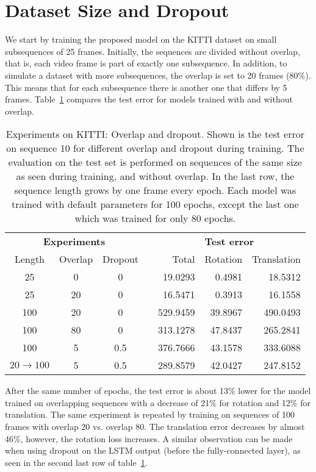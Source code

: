 	\section{Dataset Size and Dropout}
		We start by training the proposed model on the KITTI dataset on small subsequences of 25 frames. 
		Initially, the sequences are divided without overlap, that is, each video frame is part of exactly one subsequence.
		In addition, to simulate a dataset with more subsequences, the overlap is set to 20 frames (80\%). 
		This means that for each subsequence there is another one that differs by 5 frames.
		Table~\ref{tbl:kitti-overlap-and-dropout} compares the test error for models trained with and without overlap.
		\begin{table}[tb]
			\small
			\begin{center}
				\begin{tabular}{ccccrrr}
					\toprule
					\multicolumn{3}{c}{\textbf{Experiments}}	&	& \multicolumn{3}{c}{\textbf{Test error}} 		\\
					\cmidrule(lr){1-3} 					\cmidrule(lr){5-7}
					Length 			& Overlap 	& Dropout	&	& Total 	& Rotation	& Translation	\\ 
					\midrule
					25				& 0			& 0			& 	& 19.0293	& 0.4981	& 18.5312		\\ 
					25				& 20		& 0			&	& 16.5471	& 0.3913	& 16.1558		\\ 
					100				& 20		& 0			&	& 529.9459	& 39.8967	& 490.0493		\\ 
					100				& 80		& 0			& 	& 313.1278	& 47.8437	& 265.2841		\\ 
					100 			& 5			& 0.5		&	& 376.7666	& 43.1578	& 333.6088		\\ 
					$20\rightarrow100$ 	& 5		& 0.5		&	& 289.8579 	& 42.0427 	& 247.8152 		\\
					\bottomrule
				\end{tabular}
			\end{center}
			\caption[Experiments on KITTI: Overlap and dropout]
					{Experiments on KITTI: Overlap and dropout. 
					 Shown is the test error on sequence 10 for different overlap and dropout during training.
					 The evaluation on the test set is performed on sequences of the same size as seen during training, and without overlap.
					 In the last row, the sequence length grows by one frame every epoch.
					 Each model was trained with default parameters for 100 epochs, except the last one which was trained for only 80 epochs.
					 \label{tbl:kitti-overlap-and-dropout}}
		\end{table}
		After the same number of epochs, the test error is about 13\% lower for the model trained on overlapping sequences with a decrease of 21\% for rotation and 12\% for translation.
		The same experiment is repeated by training on sequences of 100 frames with overlap 20 vs. overlap 80. 
		The translation error decreases by almost 46\%, however, the rotation loss increases.
		A similar observation can be made when using dropout on the LSTM output (before the fully-connected layer), as seen in the second last row of table~\ref{tbl:kitti-overlap-and-dropout}.
		
